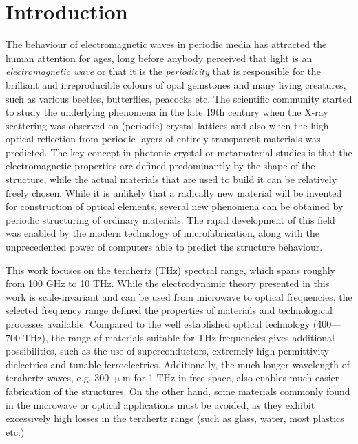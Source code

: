 \documentclass[letterpaper,12pt]{report}
\begin{document}



\chapter{Introduction}
The behaviour of electromagnetic waves in periodic media has attracted the human attention for ages, long before anybody perceived that light is an \textit{electromagnetic wave} or that it is the \textit{periodicity} that is responsible for the brilliant and irreproducible colours of opal gemstones and many living creatures, such as various beetles, butterflies, peacocks etc. %
The scientific community started to study the underlying phenomena in the late 19th century when the X-ray scattering was observed on (periodic) crystal lattices and also when the high optical reflection from periodic layers of entirely transparent materials was predicted. %
The key concept in photonic crystal or metamaterial studies is that the electromagnetic properties are defined predominantly by the shape of the structure, while the actual materials that are used to build it can be relatively freely chosen. %
While it is unlikely that a radically new material will be invented for construction of optical elements, several new phenomena can be obtained by periodic structuring of ordinary materials. The rapid development of this field was enabled by the modern technology of microfabrication, along with the unprecedented power of computers able to predict the structure behaviour.


This work focuses on the terahertz (THz) spectral range, which spans roughly from 100 GHz to 10 THz. While the electrodynamic theory presented in this work is scale-invariant and can be used from microwave to optical frequencies, the selected frequency range defined the properties of materials and technological processes available. Compared to the well established optical technology (400---700 THz), the range of materials suitable for THz frequencies gives additional possibilities, such as the use of superconductors, extremely high permittivity dielectrics and tunable ferroelectrics. Additionally, the much longer wavelength of terahertz waves, e.g. 300 $\upmu$m for 1 THz in free space, also enables much easier fabrication of the structures. On the other hand, some materials commonly found in the microwave or optical applications must be avoided, as they exhibit excessively high losses in the terahertz range (such as glass, water, most plastics etc.)
\end{document}

